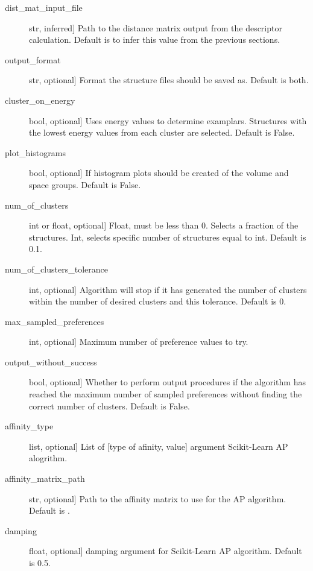 \documentclass[letterpaper,10pt,english]{sphinxmanual}
\begin{document}
\begin{fulllineitems}
\begin{fulllineitems}
\begin{description}
\item[{dist\_mat\_input\_file}] \leavevmode{[}str, inferred{]}
Path to the distance matrix output from the descriptor calculation.
Default is to infer this value from the previous sections.

\item[{output\_format}] \leavevmode{[}str, optional{]}
Format the structure files should be saved as. Default is both.

\item[{cluster\_on\_energy}] \leavevmode{[}bool, optional{]}
Uses energy values to determine examplars. Structures with the
lowest energy values from each cluster are selected.
Default is False.

\item[{plot\_histograms}] \leavevmode{[}bool, optional{]}
If histogram plots should be created of the volume and space
groups. Default is False.

\item[{num\_of\_clusters}] \leavevmode{[}int or float, optional{]}
Float, must be less than 0. Selects a fraction of the structures.
Int, selects specific number of structures equal to int.
Default is 0.1.

\item[{num\_of\_clusters\_tolerance}] \leavevmode{[}int, optional{]}
Algorithm will stop if it has generated the number of clusters
within the number of desired clusters and this tolerance.
Default is 0.

\item[{max\_sampled\_preferences}] \leavevmode{[}int, optional{]}
Maximum number of preference values to try.

\item[{output\_without\_success}] \leavevmode{[}bool, optional{]}
Whether to perform output procedures if the algorithm has reached
the maximum number of sampled preferences without finding the
correct number of clusters. Default is False.

\item[{affinity\_type}] \leavevmode{[}list, optional{]}
List of {[}type of afinity, value{]} argument Scikit-Learn AP alogrithm.

\item[{affinity\_matrix\_path}] \leavevmode{[}str, optional{]}
Path to the affinity matrix to use for the AP algorithm.
Default is .

\item[{damping}] \leavevmode{[}float, optional{]}
damping argument for Scikit-Learn AP algorithm. Default is 0.5.


\end{description}
\end{fulllineitems}
\end{fulllineitems}
\end{document}
